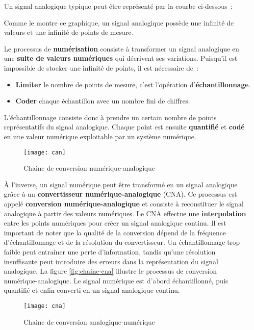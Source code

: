 Un signal analogique typique peut être représenté par la courbe ci-dessous~:

\begin{center}
\end{center}

Comme le montre ce graphique, un signal analogique possède une infinité de 
valeurs et une infinité de points de mesure.


Le processus de \textbf{numérisation} consiste à transformer un signal analogique 
en une \textbf{suite de valeurs numériques} qui décrivent ses variations. 
Puisqu'il est impossible de stocker une infinité de points, il est nécessaire de~:
\begin{itemize}
    \item \textbf{Limiter} le nombre de points de mesure, c'est l’opération d’\textbf{échantillonnage}.
    \item \textbf{Coder} chaque échantillon avec un nombre fini de chiffres.
\end{itemize}


L’échantillonnage consiste donc à prendre un certain nombre de points 
représentatifs du signal analogique. Chaque point est ensuite \textbf{quantifié} 
et \textbf{codé} en une valeur numérique exploitable par un système numérique.
\begin{figure}[H]
    \centering
    \texttt{[image: can]}
    \caption{Chaine de conversion numérique-analogique}
    \label{figCna}
\end{figure}

\`A l’inverse, un signal numérique peut être transformé en un signal analogique 
grâce à un \textbf{convertisseur numérique-analogique} (CNA). Ce processus est
appelé \textbf{conversion numérique-analogique} et consiste à reconstituer le
signal analogique à partir des valeurs numériques. Le CNA effectue une
\textbf{interpolation} entre les points numériques pour créer un signal analogique
continu. Il est important de noter que la qualité de la conversion dépend de la
fréquence d'échantillonnage et de la résolution du convertisseur. Un échantillonnage
trop faible peut entraîner une perte d'information, tandis qu'une résolution
insuffisante peut introduire des erreurs dans la représentation du signal
analogique. La figure \ref{fig:chaine-cna} illustre le processus de conversion
numérique-analogique. Le signal numérique est d'abord échantillonné, puis
quantifié et enfin converti en un signal analogique continu.
\begin{figure}[H]
    \centering
    \texttt{[image: cna]}
    \caption{Chaine de conversion analogique-numérique}
    \label{figChaineCna}
\end{figure}

